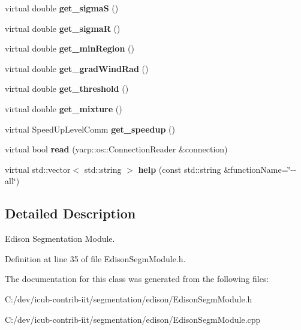 \begin{DoxyCompactItemize}
\item 
virtual double {\bfseries get\+\_\+sigmaS} ()\label{classEdisonSegmModule_a62aa5009cad7d09959ed5cdd8c358a90}

\item 
virtual double {\bfseries get\+\_\+sigmaR} ()\label{classEdisonSegmModule_ad1045be0e10cd0d40c81396f48e54b9a}

\item 
virtual double {\bfseries get\+\_\+min\+Region} ()\label{classEdisonSegmModule_ad61a5ccea53f415be9f2b76a8781689f}

\item 
virtual double {\bfseries get\+\_\+grad\+Wind\+Rad} ()\label{classEdisonSegmModule_ab9ce5f24dd33f58d543b25ec0257af41}

\item 
virtual double {\bfseries get\+\_\+threshold} ()\label{classEdisonSegmModule_a8e3ab7941df516f42357330a80d1e408}

\item 
virtual double {\bfseries get\+\_\+mixture} ()\label{classEdisonSegmModule_a58df44d5dbba062170e5e22f957da907}

\item 
virtual Speed\+Up\+Level\+Comm {\bfseries get\+\_\+speedup} ()\label{classEdisonSegmModule_ae1f22b6113534640a3faedd22505932b}

\item 
virtual bool {\bfseries read} (yarp\+::os\+::\+Connection\+Reader \&connection)\label{classSegmentationModule_a99d3baa0d96cb5a8a7aeef226759ef73}

\item 
virtual std\+::vector$<$ std\+::string $>$ {\bfseries help} (const std\+::string \&function\+Name=\char`\"{}-\/-\/all\char`\"{})\label{classSegmentationModule_af5e7c395d563e6c9b170d509c2a01e0a}

\end{DoxyCompactItemize}


\subsection{Detailed Description}
Edison Segmentation Module. 



Definition at line 35 of file Edison\+Segm\+Module.\+h.



The documentation for this class was generated from the following files\+:\begin{DoxyCompactItemize}
\item 
C\+:/dev/icub-\/contrib-\/iit/segmentation/edison/Edison\+Segm\+Module.\+h\item 
C\+:/dev/icub-\/contrib-\/iit/segmentation/edison/Edison\+Segm\+Module.\+cpp\end{DoxyCompactItemize}
